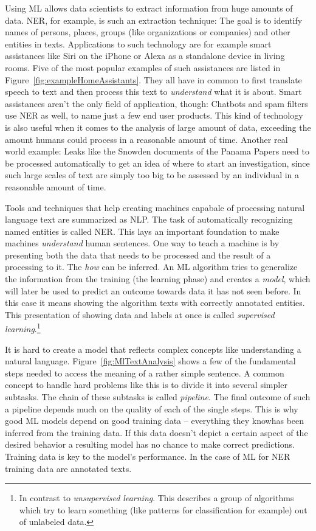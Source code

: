 	Using \ac{ML} allows data scientists to extract information from huge amounts of data. \ac{NER}, for example, is such an extraction technique: The goal is to identify names of persons, places, groups (like organizations or companies) and other entities in texts. Applications to such technology are for example smart assistances like Siri on the iPhone or Alexa as a standalone device in living rooms. Five of the most popular examples of such assistances are listed in Figure~\ref{fig:exampleHomeAssistants}. They all have in common to first translate speech to text and then process this text to \textit{understand} what it is about. Smart assistances aren't the only field of application, though: Chatbots and spam filters use \ac{NER} as well, to name just a few end user products. This kind of technology is also useful when it comes to the analysis of large amount of data, exceeding the amount humans could process in a reasonable amount of time. Another real world example: Leaks like the Snowden documents of the Panama Papers need to be processed automatically to get an idea of where to start an investigation, since such large scales of text are simply too big to be assessed by an individual in a reasonable amount of time.

	Tools and techniques that help creating machines capabale of processing natural language text are summarized as \ac{NLP}. The task of automatically recognizing named entities is called \ac{NER}. This lays an important foundation to make machines \textit{understand} human sentences. One way to teach a machine is by presenting both the data that needs to be processed and the result of a processing to it. The \textit{how} can be inferred. An \ac{ML} algorithm tries to generalize the information from the training (the learning phase) and creates a \textit{model}, which will later be used to predict an outcome towards data it has not seen before. In this case it means showing the algorithm texts with correctly annotated entities. This presentation of showing data and labels at once is called \textit{supervised learning}.\footnote{In contrast to \textit{unsupervised learning}. This describes a group of algorithms which try to learn something (like patterns for classification for example) out of unlabeled data.}

	It is hard to create a model that reflects complex concepts like understanding a natural language. Figure~\ref{fig:MlTextAnalysis} shows a few of the fundamental steps needed to access the meaning of a rather simple sentence. A common concept to handle hard problems like this is to divide it into several simpler subtasks. The chain of these subtasks is called \textit{pipeline}. The final outcome of such a pipeline depends much on the quality of each of the single steps. This is why good \ac{ML} models depend on good training data -- everything they \lqq know\rqq has been inferred from the training data. If this data doesn't depict a certain aspect of the desired behavior a resulting model has no chance to make correct predictions. Training data is key to the model's performance. In the case of \ac{ML} for \ac{NER} training data are annotated texts.


